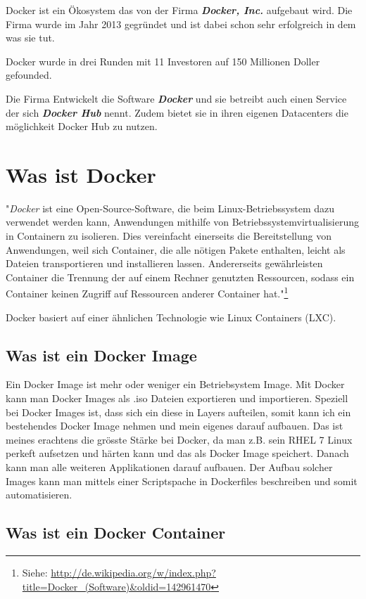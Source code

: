 Docker ist ein Ökosystem das von der Firma \textbf{\textit{Docker, Inc.}} aufgebaut wird.
Die Firma wurde im Jahr 2013 gegründet und ist dabei schon sehr erfolgreich in dem was sie tut.

Docker wurde in drei Runden mit 11 Investoren auf 150 Millionen Doller gefounded.

Die Firma Entwickelt die Software \textbf{\textit{Docker}} und sie betreibt auch einen Service der sich
\textbf{\textit{Docker Hub}} nennt. Zudem bietet sie in ihren eigenen Datacenters die möglichkeit
Docker Hub zu nutzen.

\section{Was ist Docker}

"\textit{Docker} ist eine Open-Source-Software, die beim Linux-Betriebssystem dazu verwendet werden
kann, Anwendungen mithilfe von Betriebssystemvirtualisierung in Containern zu isolieren.
Dies vereinfacht einerseits die Bereitstellung von Anwendungen, weil sich Container, die
alle nötigen Pakete enthalten, leicht als Dateien transportieren und installieren lassen.
Andererseits gewährleisten Container die Trennung der auf einem Rechner genutzten Ressourcen,
sodass ein Container keinen Zugriff auf Ressourcen anderer Container hat."\footnote{Siehe: \url{http://de.wikipedia.org/w/index.php?title=Docker_(Software)&oldid=142961470}}

Docker basiert auf einer ähnlichen Technologie wie Linux Containers (LXC).

\subsection{Was ist ein Docker Image}

Ein Docker Image ist mehr oder weniger ein Betriebsystem Image. Mit Docker kann man Docker Images
als .iso Dateien exportieren und importieren. Speziell bei Docker Images ist, dass sich ein diese
in Layers aufteilen, somit kann ich ein bestehendes Docker Image nehmen und mein eigenes darauf
aufbauen. Das ist meines erachtens die grösste Stärke bei Docker, da man z.B. sein RHEL 7 Linux
perkeft aufsetzen und härten kann und das als Docker Image speichert. Danach kann man alle
weiteren Applikationen darauf aufbauen. Der Aufbau solcher Images kann man mittels einer
Scriptspache in Dockerfiles beschreiben und somit automatisieren.

\subsection{Was ist ein Docker Container}

